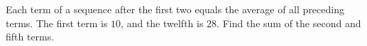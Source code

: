 Each term of a sequence after the first two equals the average of all preceding terms. The first term is $10$, and the twelfth is $28$. Find the sum of the second and fifth terms.
